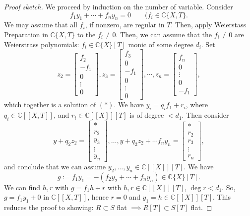\begin{proof}[Proof sketch] We proceed by induction on the number of variable.  Consider
\begin{equation}f_1y_1+\cdots + f_n y_n = 0 \qquad (f_i\in \mathds{C}\{X, T\}. \tag{$*$} \end{equation}
We may assume that all $f_i$, if nonzero, are regular in $T$.  Then, apply Weierstass Preparation in $\mathds{C}\{X, T\}$ to the $f_i\neq 0$.  Then, we can assume that the $f_i\neq0$ are Weierstrass polynomials: $f_i\in \mathds{C}\{X\}[T]$ monic of some degree $d_i$.  Set
$$z_2 = \left [ \begin{array}{c} f_2 \\ -f_1 \\ 0 \\ \vdots \\ 0 \end{array} \right ], z_3= \left [ \begin{array}{c} f_3 \\ 0 \\ -f_1 \\ 0 \\ \vdots \\ 0 \end{array} \right ], \cdots, z_n= \left [ \begin{array}{c} f_n \\ 0 \\ \vdots \\ 0 \\ -f_1\end{array} \right ],$$
which together is a solution of $(*)$.  We have $y_i=q_if_1+r_i$, where $q_i\in \mathds{C}[[X, T]]$, and $r_i\in \mathds{C}[[X]][T]$ is of degree $<d_1$.  Then consider
$$y+q_2z_2= \left [ \begin{array}{c} * \\ r_2 \\ y_3 \\ \vdots \\ y_n \end{array} \right ], \dots , y+q_2z_2+\cdots f_ny_n= \left [ \begin{array}{c} * \\ r_2\\ r_3 \\ \vdots \\ r_n \end{array} \right ],$$
and conclude that we can assume $y_2, \dots, y_n\in \mathds{C}[[X]][T]$.   We have
$$g:= f_1y_1 = -(f_2y_2+\cdots + f_ny_n)\in \mathds{C}\{X\}[T].$$
We can find $h, r$ with $g=f_1h+r$ with $h, r\in \mathds{C}[[X]][T]$, $\deg r<d_1$.  So, $g=f_1y_1+0$ in $\mathds{C}[[X, T]]$, hence $r=0$ and $y_1=h\in \mathds{C}[[X]][T]$.  This reduces the proof to showing: $R\subset S$ flat $\implies R[T]\subset S[T]$ flat.
\end{proof}

